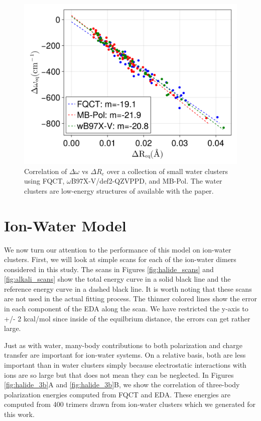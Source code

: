 \documentclass[journal=jacsat,manuscript=article]{achemso}
\begin{document}
\begin{figure}[h]
  \includegraphics*[width=\textwidth]{figures/badger_correlation_final.png}
  \caption{Correlation of $\Delta\omega$ vs $\Delta R_e$ over a collection
  of small water clusters using FQCT, $\omega$B97X-V/def2-QZVPPD, and MB-Pol.
  The water clusters are low-energy structures of  available
  with the paper.
}
  \label{fig:badger}
\end{figure}

\section*{Ion-Water Model}

We now turn our attention to the performance of this model on ion-water clusters.
First, we will look at simple scans for each of the ion-water dimers considered
in this study. The scans in Figures \ref{fig:halide_scans} and \ref{fig:alkali_scans}
show the total energy curve in a solid black line and the reference energy curve in
a dashed black line. It is worth noting that these scans are not used in the actual
fitting process. The thinner colored lines show the error in each component of the EDA
along the scan. We have restricted the y-axis to +/- 2 kcal/mol since inside of the
equilbrium distance, the errors can get rather large.

Just as with water, many-body contributions to both polarization and charge transfer
are important for ion-water systems. On a relative basis, both are less important
than in water clusters simply because electrostatic interactions with ions are so
large but that does not mean they can be neglected. In Figures \ref{fig:halide_3b}A and \ref{fig:halide_3b}B,
we show the correlation of three-body polarization energies computed from FQCT and
EDA. These energies are computed from 400 trimers drawn from ion-water clusters which
we generated for this work.
\end{document}
